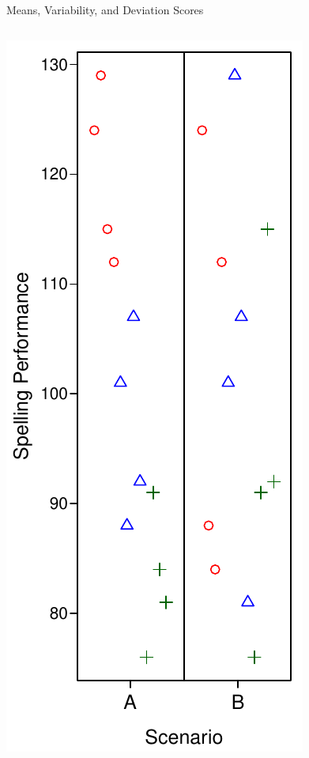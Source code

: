 \documentclass[presentation]{beamer}
\begin{document}
\begin{frame}[label={sec:org3a09c0a}]{Means, Variability, and Deviation Scores}
\begin{columns}
\begin{column}{.3\columnwidth}
\includegraphics[width=.9\linewidth]{08_glm_img/spelling-00.pdf}
\end{column}

\begin{column}{.7\columnwidth}
\end{column}
\end{columns}
\end{frame}
\end{document}
